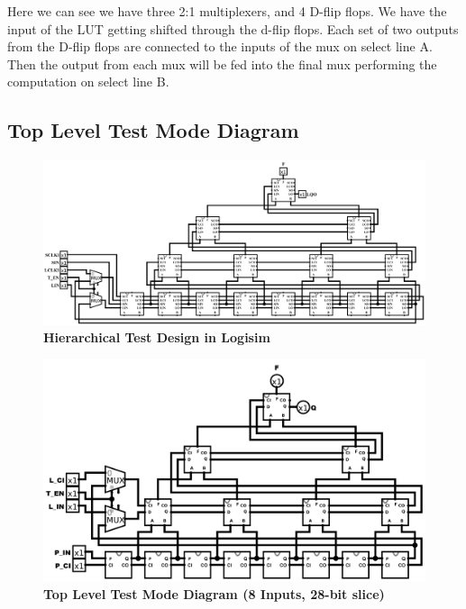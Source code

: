 \documentclass[a4paper]{article}
\begin{document}
    Here we can see we have three 2:1 multiplexers, and 4 D-flip flops. We have the input of the LUT
    getting shifted through the d-flip flops. Each set of two outputs from the D-flip flops are connected
    to the inputs of the mux on select line A. Then the output from each mux will be fed into the final mux
    performing the computation on select line B.

\subsection{\textbf{Top Level Test Mode Diagram}}
    \begin{figure}[H]
        \centering
        \includegraphics[width=\textwidth,height=\textheight,keepaspectratio]{../../logisim/hierarchical_test_top.png}
        \caption{\textbf{Hierarchical Test Design in Logisim}}
        \label{fig:gg}
    \end{figure}

    \begin{figure}[H]
        \centering
        \includegraphics[width=\textwidth,height=\textheight,keepaspectratio]{../../logisim/top_test.png}
        \caption{\textbf{Top Level Test Mode Diagram (8 Inputs, 28-bit slice)}}
        \label{fig:gg}
    \end{figure}
\end{document}
